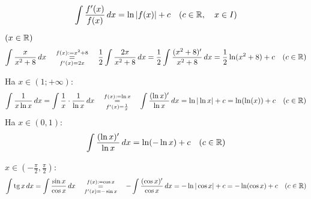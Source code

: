 \documentclass[a4paper,11.5pt]{article}
\DeclareMathOperator{\tg}{tg}
\begin{document}
	\begin{task}
		\[ \int\frac{f'(x)}{f(x)}\,dx=\ln |f(x)|+c \quad (c\in\mathbb{R}, \quad x\in I)\]
	\end{task}
	\begin{task}$(x\in\mathbb{R})$
		\[ \int\frac{x}{x^2+8}\,dx\quad \overset{f(x):=x^2+8}{\underset{f'(x)=2x}{=}}\quad\frac{1}{2}\int\frac{2x}{x^2+8}\,dx=\frac{1}{2}\int\frac{(x^2+8)'}{x^2+8}\,dx=\frac{1}{2}\ln(x^2+8)+c\quad (c\in\mathbb{R})  \]
	\end{task}
	\begin{task}Ha $x\in(1;+\infty)$:
		\[ \int\frac{1}{x\ln x}\,dx= \int\frac{1}{x}\cdot\frac{1}{\ln x}\,dx\quad \overset{f(x):=\ln x}{\underset{f'(x)=\frac{1}{x}}{=}}\quad \int\frac{(\ln x)'}{\ln x}\,dx=\ln|\ln x|+c=\ln(\ln(x))+c\quad (c\in\mathbb{R}) \]
		Ha $x\in(0,1)$:
		\[ \int\frac{(\ln x)'}{\ln x}\,dx=\ln(-\ln x)+c\quad (c\in\mathbb{R}) \]
	\end{task}
	\begin{task}$x\in\left(-\frac{\pi}{2},\frac{\pi}{2}\right)$:
		\[ \int\tg x\,dx=\int\frac{\sin x}{\cos x}\,dx\quad \overset{f(x):=\cos x}{\underset{f'(x)=-\sin x}{=}}\quad -\int\frac{(\cos x)'}{\cos x}\,dx=-\ln|\cos x|+c=-\ln(\cos x)+c\quad (c\in\R) \]
	\end{task}
\end{document}
